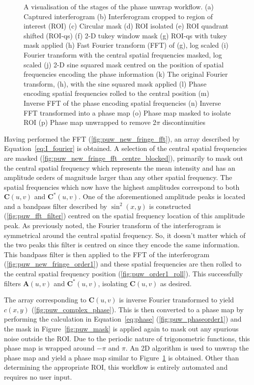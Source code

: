 \begin{figure}
\begin{subfigure}{0.23\textwidth}
		\caption{}
		\label{fig:puw_unwrapped_phase}
	\end{subfigure}
	\caption{A visualisation of the stages of the phase unwrap workflow. (a) Captured interferogram (b) Interferogram cropped to region of interest (ROI) (c) Circular mask (d) ROI isolated (e) ROI quadrant shifted (ROI-qs) (f) 2-D tukey window mask (g) ROI-qs with tukey mask applied (h) Fast Fourier transform (FFT) of (g), log scaled (i) Fourier transform with the central spatial frequencies masked, log scaled (j) 2-D sine squared mask centred on the position of spatial frequencies encoding the phase information (k) The original Fourier transform, (h), with the sine squared mask applied (l) Phase encoding spatial frequencies rolled to the central position (m) Inverse FFT of the phase encoding spatial frequencies (n) Inverse FFT transformed into a phase map (o) Phase map masked to isolate ROI (p) Phase map unwrapped to remove 2$\pi$ discontinuities}
	\label{fig:phase_unwrap_workflow}
\end{figure}

Having performed the FFT (\ref{fig:puw_new_fringe_fft}), an array described by Equation~\ref{eq:I_fourier} is obtained. A selection of the central spatial frequencies are masked (\ref{fig:puw_new_fringe_fft_centre_blocked}), primarily to mask out the central spatial frequency which represents the mean intensity and has an amplitude orders of magnitude larger than any other spatial frequency. The spatial frequencies which now have the highest amplitudes correspond to both $\boldsymbol{C}(u,v)$ and $\boldsymbol{C}^{*}(u,v)$. One of the aforementioned amplitude peaks is located and a bandpass filter described by $\sin^{2}(x,y)$ is constructed (\ref{fig:puw_fft_filter}) centred on the spatial frequency location of this amplitude peak. As previously noted, the Fourier transform of the interferogram is symmetrical around the central spatial frequency. So, it doesn't matter which of the two peaks this filter is centred on since they encode the same information. This bandpass filter is then applied to the FFT of the interferogram (\ref{fig:puw_new_fringe_order1}) and these spatial frequencies are then rolled to the central spatial frequency position (\ref{fig:puw_order1_roll}). This successfully filters $\boldsymbol{A}(u,v)$ and $\boldsymbol{C}^{*}(u,v)$, isolating $\boldsymbol{C}(u,v)$ as desired.

The array corresponding to $\boldsymbol{C}(u,v)$ is inverse Fourier transformed to yield $c(x,y)$ (\ref{fig:puw_complex_phase}). This is then converted to a phase map by performing the calculation in Equation~\ref{eq:phase} (\ref{fig:puw_phaseorder1}) and the mask in Figure~\ref{fig:puw_mask} is applied again to mask out any spurious noise outside the ROI. Due to the periodic nature of trigonometric functions, this phase map is wrapped around $-\pi$ and $\pi$. An 2D  algorithm is used to unwrap the phase map and yield a phase map similar to Figure~\ref{fig:puw_unwrapped_phase} is obtained.\cite{herraez2002fast} Other than determining the appropriate ROI, this workflow is entirely automated and requires no user input. 

